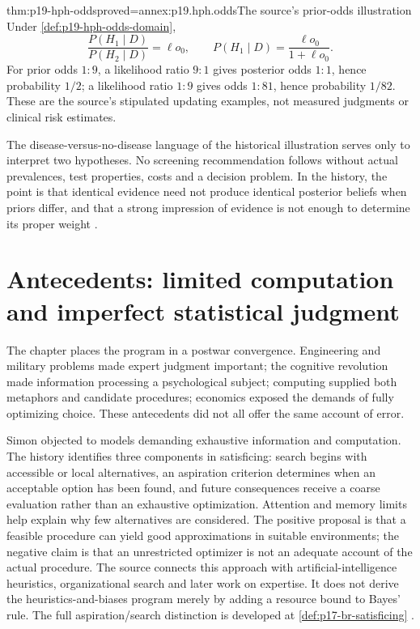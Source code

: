 \begin{hbtheorem}{thm:p19-hph-odds}{proved=annex:p19.hph.odds}{The source's prior-odds illustration}
Under \cref{def:p19-hph-odds-domain},
\[
 \frac{P(H_1\mid D)}{P(H_2\mid D)}=\ell o_0,
 \qquad P(H_1\mid D)=\frac{\ell o_0}{1+\ell o_0}.
\]
For prior odds \(1:9\), a likelihood ratio \(9:1\) gives posterior
odds \(1:1\), hence probability \(1/2\); a likelihood ratio \(1:9\)
gives odds \(1:81\), hence probability \(1/82\).
These are the source's stipulated updating examples, not measured
judgments or clinical risk estimates.
\end{hbtheorem}

The disease-versus-no-disease language of the historical illustration
serves only to interpret two hypotheses. No screening recommendation
follows without actual prevalences, test properties, costs and a decision
problem. In the history, the point is that identical evidence need not
produce identical posterior beliefs when priors differ, and that a strong
impression of evidence is not enough to determine its proper weight
\cite[pp.~323--324]{GriffinEtAl2012HeuristicsHistory}.

\section{Antecedents: limited computation and imperfect statistical judgment}
\label{sec:p19-hph-antecedents}

The chapter places the program in a postwar convergence. Engineering and
military problems made expert judgment important; the cognitive revolution
made information processing a psychological subject; computing supplied
both metaphors and candidate procedures; economics exposed the demands
of fully optimizing choice. These antecedents did not all offer the same
account of error.

Simon objected to models demanding exhaustive information and computation.
The history identifies three components in satisficing: search begins
with accessible or local alternatives, an aspiration criterion determines
when an acceptable option has been found, and future consequences receive
a coarse evaluation rather than an exhaustive optimization. Attention
and memory limits help explain why few alternatives are considered.
The positive proposal is that a feasible procedure can yield good
approximations in suitable environments; the negative claim is that
an unrestricted optimizer is not an adequate account of the actual
procedure. The source connects this approach with artificial-intelligence
heuristics, organizational search and later work on expertise. It does
not derive the heuristics-and-biases program merely by adding a resource
bound to Bayes' rule. The full aspiration/search distinction is developed
at \cref{def:p17-br-satisficing}
\cite[pp.~324--325]{GriffinEtAl2012HeuristicsHistory}.

